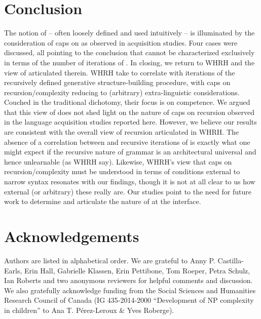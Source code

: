 \documentclass[output=paper]{langsci/langscibook}
\begin{document}
\section{Conclusion}

The notion of  -- often loosely defined and used intuitively -- is
illuminated by the consideration of caps on  as observed in
acquisition studies. Four cases were discussed, all pointing to the conclusion
that  cannot be characterized exclusively in terms of the number of
iterations of . In closing, we return to
WHRH\nocite{WatHauRobHor2014} and the view of  articulated
therein.  WHRH\nocite{WatHauRobHor2014} take  to correlate with
iterations of the recursively defined generative structure-building procedure,
with caps on recursion/complexity reducing to (arbitrary) extra-linguistic
considerations.  Couched in the traditional dichotomy, their focus is on
competence. We argued that this view of  does not shed light on
the nature of caps on recursion observed in the language
acquisition studies reported here. However, we believe
our results are consistent with the overall view of recursion articulated in
WHRH\nocite{WatHauRobHor2014}. The absence of a correlation between
 and recursive iterations of  is
exactly what one might expect if the recursive nature of grammar
is an architectural universal and hence unlearnable (as
WHRH\nocite{WatHauRobHor2014} say). Likewise, WHRH\nocite{WatHauRobHor2014}’s
view that caps on recursion/complexity must be understood in terms of
conditions external to narrow syntax resonates with our findings, though it is
not at all clear to us how external (or arbitrary) these really are. Our
studies point to the need for future work to determine and articulate the
nature of  at the interface.

\printchapterglossary{}

\section*{Acknowledgements}

Authors are listed in alphabetical order. We are grateful to Anny P.
Castilla-Earls, Erin Hall, Gabrielle Klassen, Erin Pettibone, Tom Roeper, Petra
Schulz, Ian Roberts and two anonymous reviewers for helpful comments and
discussion. We also gratefully acknowledge funding from the Social Sciences and
Humanities Research Council of Canada (IG 435-2014-2000 \enquote{Development of
NP complexity in children} to Ana T. Pérez-Leroux \& Yves Roberge).

{\sloppy
\printbibliography[heading=subbibliography,notkeyword=this]
}
\end{document}
